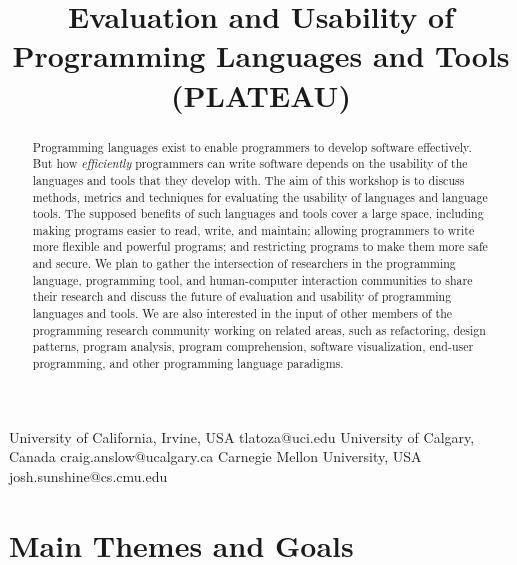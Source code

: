 \documentclass{sigplanconf}
\begin{document}
\title{Evaluation and Usability of Programming Languages and Tools (PLATEAU)}

           {University of California, Irvine, USA}
           {tlatoza@uci.edu} 
           {University of Calgary, Canada}
           {craig.anslow@ucalgary.ca}
           {Carnegie Mellon University, USA}
           {josh.sunshine@cs.cmu.edu}
\date{}

\maketitle
\begin{abstract}

  Programming languages exist to enable programmers to develop
  software effectively.  But how \emph{efficiently} programmers can
  write software depends on the usability of the languages and tools
  that they develop with.  The aim of this workshop is to discuss
  methods, metrics and techniques for evaluating the usability of
  languages and language tools.  The supposed benefits of such
  languages and tools cover a large space, including making programs
  easier to read, write, and maintain; allowing programmers to write
  more flexible and powerful programs; and restricting programs to
  make them more safe and secure. We plan to gather the intersection
  of researchers in the programming language, programming tool, and
  human-computer interaction communities to share their research and
  discuss the future of evaluation and usability of programming
  languages and tools. We are also interested in the input of other
  members of the programming research community working on related
  areas, such as refactoring, design patterns, program analysis,
  program comprehension, software visualization, end-user programming,
  and other programming language paradigms.

\end{abstract}





\section{Main Themes and Goals}
\end{document}
